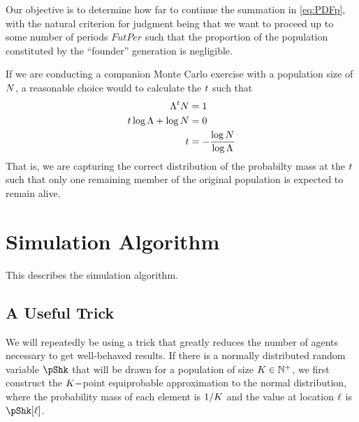 \documentclass[\econtexRoot/BufferStockTheory.tex]{subfiles}
\begin{document}
Our objective is to determine how far to continue the summation in \eqref{eq:PDFp}, with the natural criterion for judgment being that we want to proceed up to some number of periods $FutPer$ such that the proportion of the population constituted by the ``founder'' generation is negligible.

If we are conducting a companion Monte Carlo exercise with a population size of $N$, a reasonable choice would to calculate the $t$ such that
\begin{align*}
  \Lambda^{t}N & = 1 
  \\  t \log \Lambda + \log N & = 0
  \\  t  & = - \frac{\log N}{\log \Lambda}  \label{eq:lessThanOneLeft}
\end{align*}
That is, we are capturing the correct distribution of the probabilty mass at the $t$ such that only one remaining member of the original population is expected to remain alive.

\section{Simulation Algorithm}

This describes the simulation algorithm.

\subsection{A Useful Trick}

We will repeatedly be using a trick that greatly reduces the number of agents necessary to get well-behaved results.  If there is a normally distributed random variable $\pShk$ that will be drawn for a population of size $K \in \mathbb{N}^{+}$, we first construct the $K-$point equiprobable approximation to the normal distribution, where the probability mass of each element is $1/K$ and the value at location $\ell$ is $\pShk[\posn]$.
\end{document}
